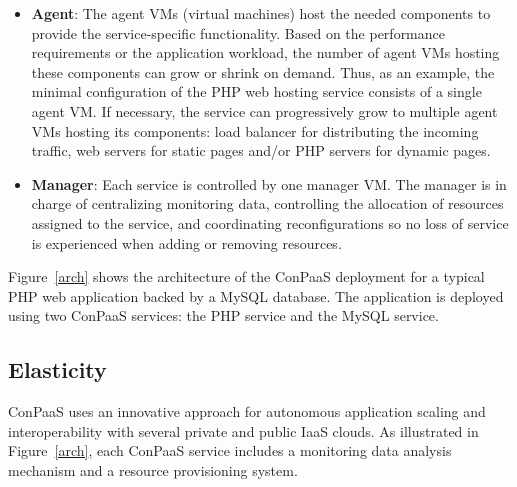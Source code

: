 \begin{itemize}
\item \textbf{Agent}: The agent VMs (virtual machines) host the needed components to provide the service-specific functionality. Based on the performance requirements or the application workload, the number of agent VMs hosting these components can grow or shrink on demand. Thus, as an example, the minimal configuration of the PHP web hosting service consists of a single agent VM. If necessary,
the service can progressively grow to multiple agent VMs hosting its
components: load balancer for distributing the incoming traffic, web
servers for static pages and/or PHP servers for dynamic pages.
\item \textbf{Manager}: Each service is controlled by one manager VM. The manager is in charge of centralizing monitoring data, controlling the allocation of resources assigned to the service, and coordinating reconfigurations so no loss of service is experienced when adding or removing resources.
\end{itemize}

Figure~\ref{arch} shows the architecture of the ConPaaS deployment for
a typical PHP web application backed by a MySQL database. The
application is deployed using two ConPaaS services: the PHP service
and the MySQL service.


\subsection*{Elasticity}

ConPaaS uses an innovative approach for autonomous application scaling
and interoperability with several private and public IaaS clouds. As
illustrated in Figure~\ref{arch}, each ConPaaS service includes a
monitoring data analysis mechanism and a resource provisioning system.

